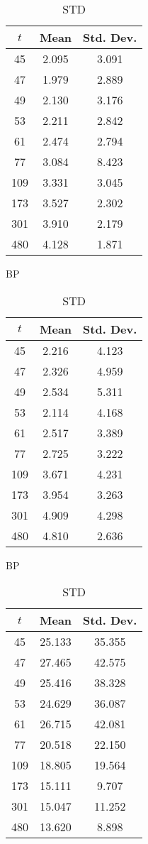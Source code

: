 \begin{table}[ht]
\centering
\begin{subtable}{0.33\textwidth}
\centering
{\tablecolors
\begin{tabular}{|c|c|c|}
\hline
$t$ & Mean & Std. Dev. \\
\hline
45 & 2.095 & 3.091 \\
\hline
47 & 1.979 & 2.889 \\
\hline
49 & 2.130 & 3.176 \\
\hline
53 & 2.211 & 2.842 \\
\hline
61 & 2.474 & 2.794 \\
\hline
77 & 3.084 & 8.423 \\
\hline
109 & 3.331 & 3.045 \\
\hline
173 & 3.527 & 2.302 \\
\hline
301 & 3.910 & 2.179 \\
\hline
480 & 4.128 & 1.871 \\
\hline
\end{tabular}}
\caption{\uo{} BP}
\end{subtable}%
\begin{subtable}{0.33\textwidth}
\centering
{\tablecolors
\begin{tabular}{|c|c|c|}
\hline
$t$ & Mean & Std. Dev. \\
\hline
45 & 2.216 & 4.123 \\
\hline
47 & 2.326 & 4.959 \\
\hline
49 & 2.534 & 5.311 \\
\hline
53 & 2.114 & 4.168 \\
\hline
61 & 2.517 & 3.389 \\
\hline
77 & 2.725 & 3.222 \\
\hline
109 & 3.671 & 4.231 \\
\hline
173 & 3.954 & 3.263 \\
\hline
301 & 4.909 & 4.298 \\
\hline
480 & 4.810 & 2.636 \\
\hline
\end{tabular}}
\caption{\pp{} BP}
\end{subtable}%
\begin{subtable}{0.33\textwidth}
\centering
{\tablecolors
\begin{tabular}{|c|c|c|}
\hline
$t$ & Mean & Std. Dev. \\
\hline
45 & 25.133 & 35.355 \\
\hline
47 & 27.465 & 42.575 \\
\hline
49 & 25.416 & 38.328 \\
\hline
53 & 24.629 & 36.087 \\
\hline
61 & 26.715 & 42.081 \\
\hline
77 & 20.518 & 22.150 \\
\hline
109 & 18.805 & 19.564 \\
\hline
173 & 15.111 & 9.707 \\
\hline
301 & 15.047 & 11.252 \\
\hline
480 & 13.620 & 8.898 \\
\hline
\end{tabular}}
\caption{\uo{} STD}
\end{subtable}


\end{table}
